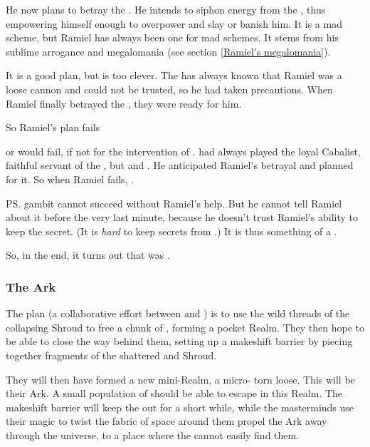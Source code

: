 He now plans to betray the \banes. 
He intends to siphon energy from the \Voidbringer, thus empowering himself enough to overpower \Daggerrain{} and slay or banish him. 
It is a mad scheme, but Ramiel has always been one for mad schemes. It stems from his sublime arrogance and megalomania (see section \ref{Ramiel's megalomania}). 

It is a good plan, but \Daggerrain{} is too clever. 
The \banelord{} has always known that Ramiel was a loose cannon and could not be trusted, so he had taken precautions. 
When Ramiel finally betrayed the \banes, they were ready for him. 

So Ramiel's plan fails\prikker

\prikker or would fail, if not for the intervention of \Azraid. 
\Azraid{} had always played the loyal Cabalist, faithful servant of the \banelords, but  and . 
He anticipated Ramiel's betrayal and planned for it. 
So when Ramiel fails, . 

\ps{\Azraid} gambit cannot succeed without Ramiel's help. 
But he cannot tell Ramiel about it before the very last minute, because he doesn't trust Ramiel's ability to keep the secret. 
(It is \emph{hard} to keep secrets from \Daggerrain.) 
It is thus something of a . 

So, in the end, it turns out that \Azraid{} was . 





\subsubsection{The Ark}
The plan (a collaborative effort between \Azraid{} and \Ishnaruchaefir) is to use the wild threads of the collapsing Shroud to  free a chunk of \Miith{}, forming a pocket Realm. 
They then hope to be able to close the way behind them, setting up a makeshift barrier by piecing together fragments of the shattered \CrystalSphere{} and Shroud.

They will then have formed a new mini-Realm, a micro-\Miith{} torn loose. 
This will be their Ark. 
A small population of \Miithians should be able to escape in this Realm. 
The makeshift barrier will keep the \banes{} out for a short while, while the masterminds use their magic to twist the fabric of space around them propel the Ark away through the universe, to a place where the \banes{} cannot easily find them. 

